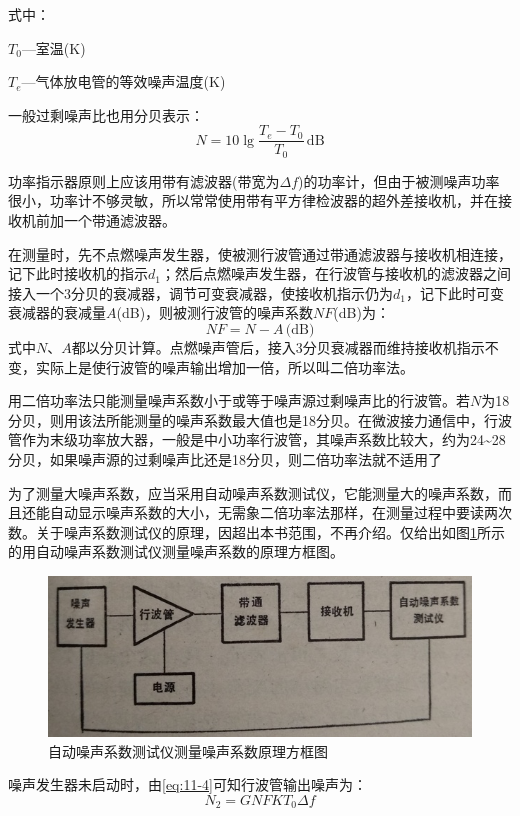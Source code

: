 式中：

$ T_0 $—室温(K)


$ T_e $—气体放电管的等效噪声温度(K)


一般过剩噪声比也用分贝表示：
\begin{equation} \label{eq:11-7}
	N = 10\lg \frac{T_e - T_0}{T_0}\,\textrm{dB}
\end{equation}


功率指示器原则上应该用带有滤波器(带宽为$ \Delta f $)的功率计，但由于被测噪声功率很小，功率计不够灵敏，所以常常使用带有平方律检波器的超外差接收机，并在接收机前加一个带通滤波器。


在测量时，先不点燃噪声发生器，使被测行波管通过带通滤波器与接收机相连接，记下此时接收机的指示$ d_1 $；然后点燃噪声发生器，在行波管与接收机的滤波器之间接入一个3分贝的衰减器，调节可变衰减器，使接收机指示仍为$ d_1 $，记下此时可变衰减器的衰减量$ A$(dB)，则被测行波管的噪声系数$ NF $(dB)为：
\begin{equation} \label{eq:11-8}
	NF = N - A \,\textrm{(dB)}
\end{equation}
式中$ N $、$ A $都以分贝计算。点燃噪声管后，接入3分贝衰减器而维持接收机指示不变，实际上是使行波管的噪声输出增加一倍，所以叫二倍功率法。


用二倍功率法只能测量噪声系数小于或等于噪声源过剩噪声比的行波管。若$ N $为18分贝，则用该法所能测量的噪声系数最大值也是18分贝。在微波接力通信中，行波管作为末级功率放大器，一般是中小功率行波管，其噪声系数比较大，约为24\textasciitilde28分贝，如果噪声源的过剩噪声比还是18分贝，则二倍功率法就不适用了


为了测量大噪声系数，应当采用自动噪声系数测试仪，它能测量大的噪声系数，而且还能自动显示噪声系数的大小，无需象二倍功率法那样，在测量过程中要读两次数。关于噪声系数测试仪的原理，因超出本书范围，不再介绍。仅给出如图\ref{ch11-8}所示的用自动噪声系数测试仪测量噪声系数的原理方框图。

\begin{figure}[phtb]
	\centering
	\includegraphics[width=0.6\linewidth]{figure/ch11-8}
	\caption{自动噪声系数测试仪测量噪声系数原理方框图}
	\label{ch11-8}
\end{figure}

噪声发生器未启动时，由\eqref{eq:11-4}可知行波管输出噪声为：
\begin{equation*} 
	N_2 = GNFKT_0\Delta f
\end{equation*}


